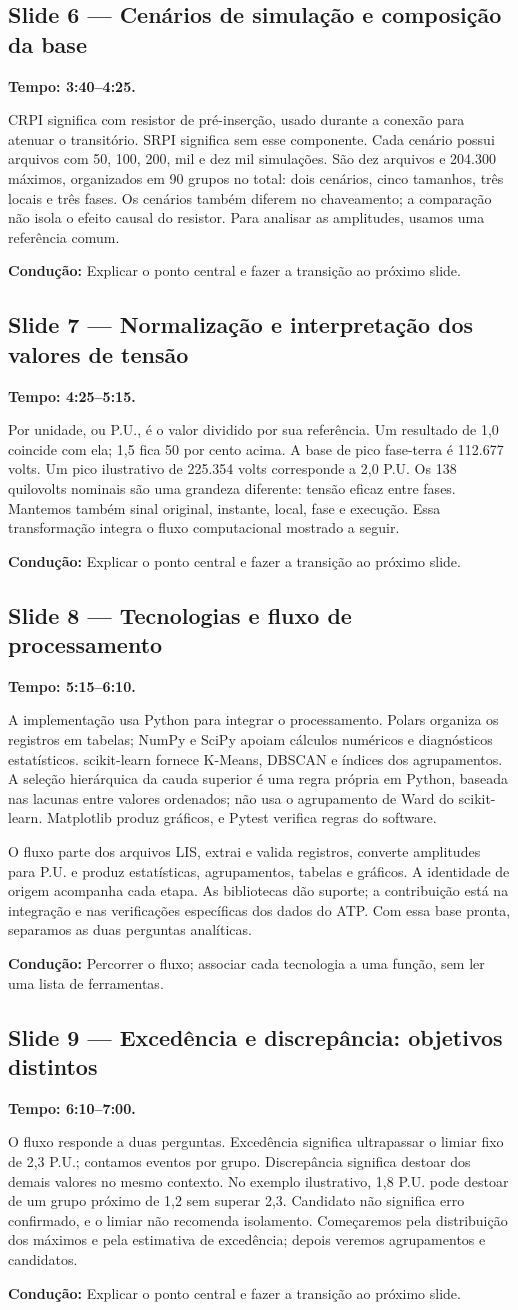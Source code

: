 \documentclass[11pt,a4paper]{article}
\newcommand{\slide}[3]{\Needspace{8\baselineskip}
  \subsection*{Slide #1 --- #2}
  \textbf{Tempo: #3.}\par}
\newcommand{\cue}[1]{\par{\small\color{accent}\textbf{Condução:} #1}\par}
\begin{document}
\slide{6}{Cenários de simulação e composição da base}{3:40--4:25}
CRPI significa com resistor de pré-inserção, usado durante a conexão para atenuar o transitório. SRPI significa sem esse componente. Cada cenário possui arquivos com 50, 100, 200, mil e dez mil simulações. São dez arquivos e 204.300 máximos, organizados em 90 grupos no total: dois cenários, cinco tamanhos, três locais e três fases. Os cenários também diferem no chaveamento; a comparação não isola o efeito causal do resistor. Para analisar as amplitudes, usamos uma referência comum.
\cue{Explicar o ponto central e fazer a transição ao próximo slide.}


\slide{7}{Normalização e interpretação dos valores de tensão}{4:25--5:15}
Por unidade, ou P.U., é o valor dividido por sua referência. Um resultado de 1,0 coincide com ela; 1,5 fica 50 por cento acima. A base de pico fase-terra é 112.677 volts. Um pico ilustrativo de 225.354 volts corresponde a 2,0 P.U. Os 138 quilovolts nominais são uma grandeza diferente: tensão eficaz entre fases. Mantemos também sinal original, instante, local, fase e execução. Essa transformação integra o fluxo computacional mostrado a seguir.
\cue{Explicar o ponto central e fazer a transição ao próximo slide.}


\slide{8}{Tecnologias e fluxo de processamento}{5:15--6:10}
A implementação usa Python para integrar o processamento. Polars organiza os registros em tabelas; NumPy e SciPy apoiam cálculos numéricos e diagnósticos estatísticos. scikit-learn fornece K-Means, DBSCAN e índices dos agrupamentos. A seleção hierárquica da cauda superior é uma regra própria em Python, baseada nas lacunas entre valores ordenados; não usa o agrupamento de Ward do scikit-learn. Matplotlib produz gráficos, e Pytest verifica regras do software.

O fluxo parte dos arquivos LIS, extrai e valida registros, converte amplitudes para P.U. e produz estatísticas, agrupamentos, tabelas e gráficos. A identidade de origem acompanha cada etapa. As bibliotecas dão suporte; a contribuição está na integração e nas verificações específicas dos dados do ATP. Com essa base pronta, separamos as duas perguntas analíticas.
\cue{Percorrer o fluxo; associar cada tecnologia a uma função, sem ler uma lista de ferramentas.}


\slide{9}{Excedência e discrepância: objetivos distintos}{6:10--7:00}
O fluxo responde a duas perguntas. Excedência significa ultrapassar o limiar fixo de 2,3 P.U.; contamos eventos por grupo. Discrepância significa destoar dos demais valores no mesmo contexto. No exemplo ilustrativo, 1,8 P.U. pode destoar de um grupo próximo de 1,2 sem superar 2,3. Candidato não significa erro confirmado, e o limiar não recomenda isolamento. Começaremos pela distribuição dos máximos e pela estimativa de excedência; depois veremos agrupamentos e candidatos.
\cue{Explicar o ponto central e fazer a transição ao próximo slide.}
\end{document}
